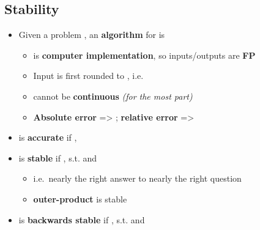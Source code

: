 \subsection*{Stability}

\begin{itemize}

\item
  Given a problem , an \textbf{algorithm} for
   is 

  \begin{itemize}
  
  \item
     is \textbf{computer implementation}, so
    inputs/outputs are \textbf{FP}
  \item
    Input  is first rounded to ,
    i.e.~
  \item
     cannot be \textbf{continuous} \emph{(for the most
    part)}
  \item
    \textbf{Absolute error} =\textgreater{}
    ; \textbf{relative error}
    =\textgreater{} 
  \end{itemize}
\item
   is \textbf{accurate} if ,
\item
   is \textbf{stable} if ,
   s.t.
  and

  \begin{itemize}
  
  \item
    i.e.~nearly the right answer to nearly the right question
  \item
    \textbf{outer-product} is stable
  \end{itemize}
\item
   is \textbf{backwards stable} if
  ,  s.t.
   and


\end{itemize}
